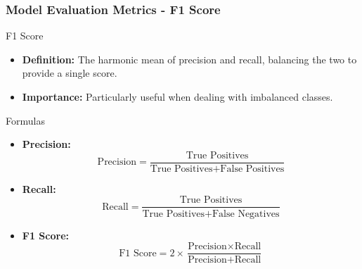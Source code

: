 \documentclass[aspectratio=169]{beamer}
\begin{document}
\begin{frame}[fragile]
    \frametitle{Model Evaluation Metrics - F1 Score}
    \begin{block}{F1 Score}
        \begin{itemize}
            \item \textbf{Definition:} The harmonic mean of precision and recall, balancing the two to provide a single score.
            \item \textbf{Importance:} Particularly useful when dealing with imbalanced classes.
        \end{itemize}
        \begin{block}{Formulas}
            \begin{itemize}
                \item \textbf{Precision:} 
                  \begin{equation}
                  \text{Precision} = \frac{\text{True Positives}}{\text{True Positives} + \text{False Positives}}
                  \end{equation}
                \item \textbf{Recall:} 
                  \begin{equation}
                  \text{Recall} = \frac{\text{True Positives}}{\text{True Positives} + \text{False Negatives}}
                  \end{equation}
                \item \textbf{F1 Score:} 
                  \begin{equation}
                  \text{F1 Score} = 2 \times \frac{\text{Precision} \times \text{Recall}}{\text{Precision} + \text{Recall}}
                  \end{equation}
            \end{itemize}
        \end{block}
    \end{block}
\end{frame}
\end{document}
